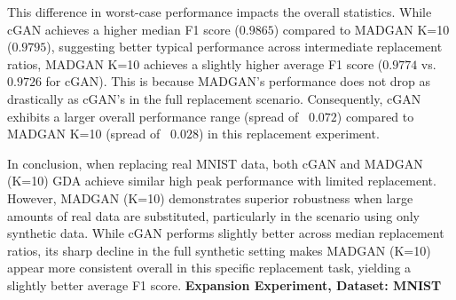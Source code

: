 This difference in worst-case performance impacts the overall statistics. While cGAN achieves a higher median F1 score ($0.9865$) compared to MADGAN K=10 ($0.9795$), suggesting better typical performance across intermediate replacement ratios, MADGAN K=10 achieves a slightly higher average F1 score ($0.9774$ vs. $0.9726$ for cGAN). This is because MADGAN's performance does not drop as drastically as cGAN's in the full replacement scenario. Consequently, cGAN exhibits a larger overall performance range (spread of ~$0.072$) compared to MADGAN K=10 (spread of ~$0.028$) in this replacement experiment.

In conclusion, when replacing real MNIST data, both cGAN and MADGAN (K=10) GDA achieve similar high peak performance with limited replacement. However, MADGAN (K=10) demonstrates superior robustness when large amounts of real data are substituted, particularly in the scenario using only synthetic data. While cGAN performs slightly better across median replacement ratios, its sharp decline in the full synthetic setting makes MADGAN (K=10) appear more consistent overall in this specific replacement task, yielding a slightly better average F1 score.
\newpage
\noindent\textbf{Expansion Experiment, Dataset: MNIST}
